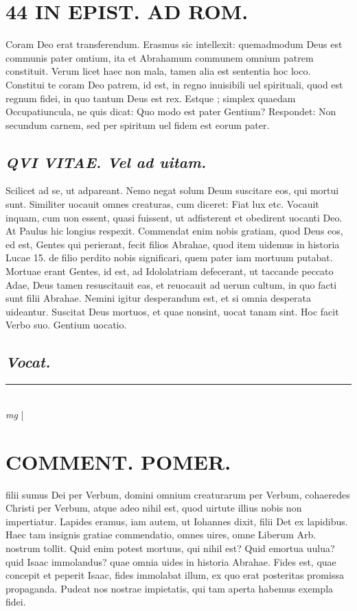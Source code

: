 \documentclass{article}
\begin{document}
\begin{pages}
\section*{44 IN EPIST. AD ROM.  }
\marginpar{[ p.]}\pstart Coram Deo erat transferendum. Erasmus sic intellexit: quemadmodum Deus est communis pater omtium, ita et Abrahamum communem omnium patrem constituit. Verum licet haec non mala, tamen alia est sententia hoc loco. Constitui te coram Deo patrem, id est, in regno inuisibili uel spirituali, quod est regnum fidei, in quo tantum Deus est rex. Estque ; simplex quaedam Occupatiuncula, ne quis dicat: Quo modo est pater Gentium? Respondet: Non secundum carnem, sed per spiritum uel fidem est eorum pater.   \pend
{}
{}
\subsection*{\textit{QVI VITAE. Vel ad uitam.  }}\pstart Scilicet ad se, ut adpareant. Nemo negat solum Deum suscitare eos, qui mortui sunt. Similiter uocauit omnes creaturas, cum diceret: Fiat lux etc. Vocauit inquam, cum uon essent, quasi fuissent, ut adfisterent et obedirent uocanti Deo. At Paulus hic longius respexit. Commendat enim nobis gratiam, quod Deus eos, ed est, Gentes qui perierant, fecit filios Abrahae, quod item uidemus in historia Lucae 15. de filio perdito nobis significari, quem pater iam mortuum putabat. Mortuae erant Gentes, id est, ad Idololatriam defecerant, ut taccande peccato Adae, Deus tamen resuscitauit eas, et reuocauit ad uerum cultum, in quo facti sunt filii Abrahae. Nemini igitur desperandum est, et si omnia desperata uideantur. Suscitat Deus mortuos, et quae nonsint, uocat tanam sint. Hoc facit Verbo suo. Gentium uocatio.   \pend
{}
{}
\subsection*{\textit{Vocat. }}
\vspace{0.5cm}\noindent
\vspace{0.2cm}\rule{1cm}{0.2pt}\\ 
\hspace{0.2cm}\textit{mg}
\footnotesize 
\normalsize| 
\section*{COMMENT. POMER.  }\pstart filii sumus Dei per Verbum, domini omnium creaturarum per Verbum, cohaeredes Christi per Verbum, atque adeo nihil est, quod uirtute illius nobis non impertiatur. Lapides eramus, iam autem, ut Iohannes dixit, filii Det ex lapidibus. Haec tam insignis gratiae commendatio, omnes uires, omne Liberum Arb. nostrum tollit. Quid enim potest mortuus, qui nihil est? Quid emortua uulua? quid Isaac immolandus? quae omnia uides in historia Abrahae. Fides est, quae concepit et peperit Isaac, fides immolabat illum, ex quo erat posteritas promissa propaganda. Pudeat nos nostrae impietatis, qui tam aperta habemus exempla fidei.   \pend
{}
{}

\end{pages}
\end{document}
